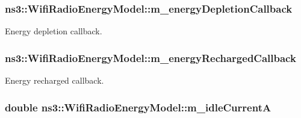 \subsubsection[{\texorpdfstring{m\+\_\+energy\+Depletion\+Callback}{m_energyDepletionCallback}}]{ ns3\+::\+Wifi\+Radio\+Energy\+Model\+::m\+\_\+energy\+Depletion\+Callback\hspace{0.3cm}{\ttfamily [private]}}\hypertarget{classns3_1_1WifiRadioEnergyModel_a0ab3934b2689e98271139392afae9257}{}\label{classns3_1_1WifiRadioEnergyModel_a0ab3934b2689e98271139392afae9257}


Energy depletion callback. 

\subsubsection[{\texorpdfstring{m\+\_\+energy\+Recharged\+Callback}{m_energyRechargedCallback}}]{ ns3\+::\+Wifi\+Radio\+Energy\+Model\+::m\+\_\+energy\+Recharged\+Callback\hspace{0.3cm}{\ttfamily [private]}}\hypertarget{classns3_1_1WifiRadioEnergyModel_a420321432e0dc4b87eec0add426068e6}{}\label{classns3_1_1WifiRadioEnergyModel_a420321432e0dc4b87eec0add426068e6}


Energy recharged callback. 

\subsubsection[{\texorpdfstring{m\+\_\+idle\+CurrentA}{m_idleCurrentA}}]{\setlength{\rightskip}{0pt plus 5cm}double ns3\+::\+Wifi\+Radio\+Energy\+Model\+::m\+\_\+idle\+CurrentA\hspace{0.3cm}{\ttfamily [private]}}\hypertarget{classns3_1_1WifiRadioEnergyModel_a0d7942dec1faf5c3ecc7c0f908280bc2}{}\label{classns3_1_1WifiRadioEnergyModel_a0d7942dec1faf5c3ecc7c0f908280bc2}


